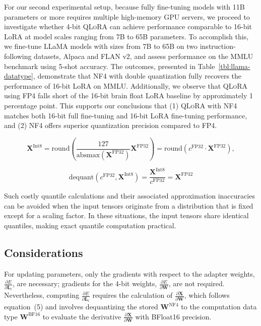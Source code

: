 For our second experimental setup, because fully fine-tuning models with 11B parameters or more requires multiple high-memory GPU servers, we proceed to investigate whether 4-bit \textsc{QLoRA} can achieve performance comparable to 16-bit LoRA at model scales ranging from 7B to 65B parameters. To accomplish this, we fine-tune LLaMA models with sizes from 7B to 65B on two instruction-following datasets, Alpaca and FLAN v2, and assess performance on the MMLU benchmark using 5-shot accuracy. The outcomes, presented in Table~\ref{tbl:llama-datatype}, demonstrate that NF4 with double quantization fully recovers the performance of 16-bit LoRA on MMLU. Additionally, we observe that \textsc{QLoRA} using FP4 falls short of the 16-bit brain float LoRA baseline by approximately 1 percentage point. This supports our conclusions that (1) \textsc{QLoRA} with NF4 matches both 16-bit full fine-tuning and 16-bit LoRA fine-tuning performance, and (2) NF4 offers superior quantization precision compared to FP4.

\begin{equation}
    \mathbf{X}^{ \text{Int8}} = \text{round}\left( \frac{127}{{\text{absmax}}(\mathbf{X}^{{\text{FP32}}})}\mathbf{X}^{{\text{FP32}}} \right) = \text{round}(c^{\text{FP32}}\cdot \mathbf{X}^{{\text{FP32}}}),
\end{equation}

\begin{equation}
    \text{dequant}(c^{\text{FP32}}, \mathbf{X}^{\text{Int8}}) = \frac{\mathbf{X}^{\text{Int8}}}{c^{\text{FP32}}} = \mathbf{X}^{\text{FP32}}
\end{equation}

Such costly quantile calculations and their associated approximation inaccuracies can be avoided when the input tensors originate from a distribution that is fixed except for a scaling factor. In these situations, the input tensors share identical quantiles, making exact quantile computation practical.

\subsection{Considerations}
\label{ssec:considerations}

For updating parameters, only the gradients with respect to the adapter weights, $\frac{\partial E}{\partial \mathbf{L}_i}$, are necessary; gradients for the 4-bit weights, $\frac{\partial E}{\partial \mathbf{W}}$, are not required. Nevertheless, computing $\frac{\partial E}{\partial \mathbf{L}_i}$ requires the calculation of $\frac{\partial \mathbf{X}}{\partial \mathbf{W}}$, which follows equation~(5) and involves dequantizing the stored $\mathbf{W}^{\text{NF4}}$ to the computation data type $\mathbf{W}^{\text{BF16}}$ to evaluate the derivative $\frac{\partial \mathbf{X}}{\partial \mathbf{W}}$ with BFloat16 precision.

